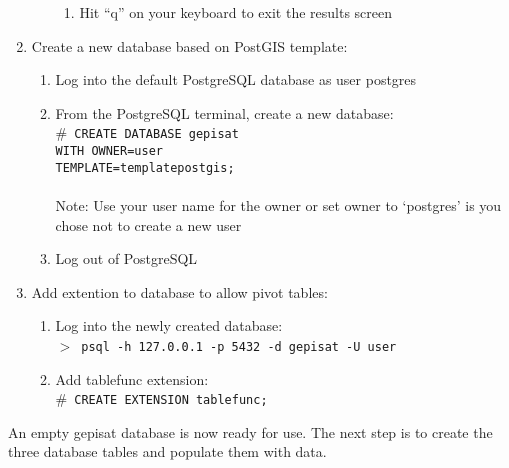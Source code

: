 \begin{enumerate}
\begin{enumerate}
\begin{enumerate}
            \item Hit ``q'' on your keyboard to exit the results screen
        \end{enumerate}
    \end{enumerate}
    \item Create a new database based on PostGIS template:
    \begin{enumerate}
        \item Log into the default PostgreSQL database as user postgres
        \item From the PostgreSQL terminal, create a new database:\\
              $\#$~\texttt{CREATE DATABASE gepisat\\ 
              WITH OWNER=user\\ 
              TEMPLATE=template\textunderscore postgis;}\\
              \\
              Note: Use your user name for the owner or set owner to 
              `postgres' is you chose not to create a new user
        \item Log out of PostgreSQL
    \end{enumerate}
    \item Add extention to database to allow pivot tables:
    \begin{enumerate}
        \item Log into the newly created database:\\
              $>$~\texttt{psql -h 127.0.0.1 -p 5432 -d gepisat -U user}
        \item Add tablefunc extension:\\
              $\#$~\texttt{CREATE EXTENSION tablefunc;}
    \end{enumerate}
\end{enumerate}

An empty gepisat database is now ready for use.  
The next step is to create the three database tables and populate them with data.
